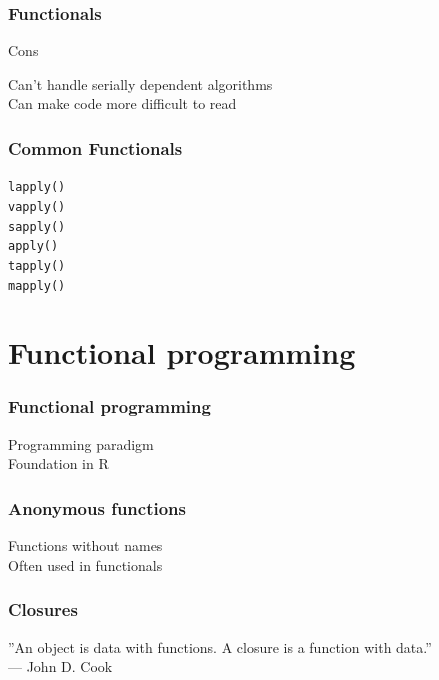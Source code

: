 \documentclass{beamer}
\begin{document}
\begin{frame}
	\frametitle{Functionals}
	\centerline{Cons}
	\begin{center}
		Can't handle serially dependent algorithms \\
		Can make code more difficult to read
	\end{center}
\end{frame}

\begin{frame}
	\frametitle{Common Functionals}
	\begin{center}
		\texttt{lapply()} \\
		\texttt{vapply()} \\
		\texttt{sapply()} \\
		\texttt{apply()} \\
		\texttt{tapply()} \\
		\texttt{mapply()} \\
	\end{center}
\end{frame}

\section{Functional programming}

\begin{frame}
	\frametitle{Functional programming}
	\begin{center}
		Programming paradigm \\
		Foundation in R
	\end{center}
\end{frame}

\begin{frame}
	\frametitle{Anonymous functions}
	\begin{center}
		Functions without names \\
		Often used in functionals
	\end{center}
\end{frame}


\begin{frame}
	\frametitle{Closures}
	\begin{center}
		''An object is data with functions. A closure is a function with 
		data.'' \\ 
		— John D. Cook
	\end{center}
\end{frame}
\end{document}
